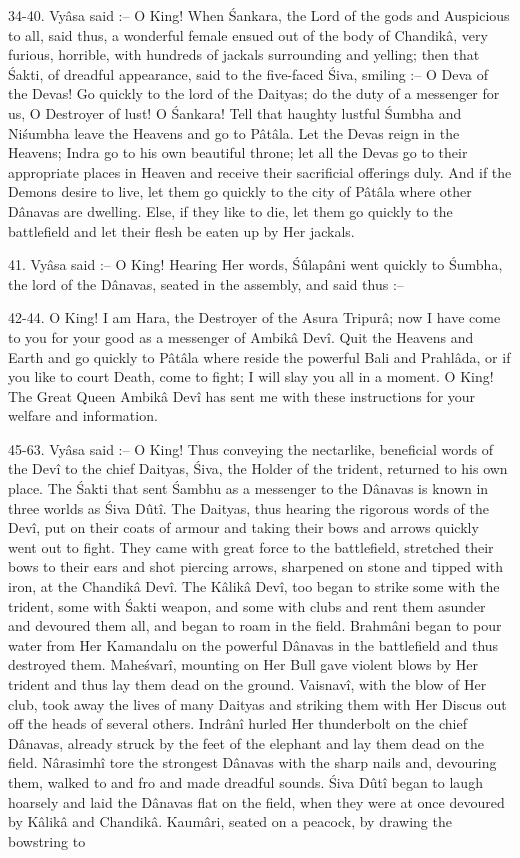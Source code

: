 34-40. Vy\^asa said :-- O King! When \'Sankara, the Lord of the gods and Auspicious to all, said thus, a wonderful female ensued out of the body of Chandik\^a, very furious, horrible, with hundreds of jackals surrounding and yelling; then that \'Sakti, of dreadful appearance, said to the five-faced \'Siva, smiling :-- O Deva of the Devas! Go quickly to the lord of the Daityas; do the duty of a messenger for us, O Destroyer of lust! O \'Sankara! Tell that haughty lustful \'Sumbha and Ni\'sumbha leave the Heavens and go to P\^at\^ala. Let the Devas reign in the Heavens; Indra go to his own beautiful throne; let all the Devas go to their appropriate places in Heaven and receive their sacrificial offerings duly. And if the Demons desire to live, let them go quickly to the city of P\^at\^ala where other D\^anavas are dwelling. Else, if they like to die, let them go quickly to the battlefield and let their flesh be eaten up by Her jackals.

41. Vy\^asa said :-- O King! Hearing Her words, \'S\^ulap\^ani went quickly to \'Sumbha, the lord of the D\^anavas, seated in the assembly, and said thus :--

42-44. O King! I am Hara, the Destroyer of the Asura Tripur\^a; now I have come to you for your good as a messenger of Ambik\^a Dev\^i. Quit the Heavens and Earth and go quickly to P\^at\^ala where reside the powerful Bali and Prahl\^ada, or if you like to court Death, come to fight; I will slay you all in a moment. O King! The Great Queen Ambik\^a Dev\^i has sent me with these instructions for your welfare and information.

45-63. Vy\^asa said :-- O King! Thus conveying the nectarlike, beneficial words of the Dev\^i to the chief Daityas, \'Siva, the Holder of the trident, returned to his own place. The \'Sakti that sent \'Sambhu as a messenger to the D\^anavas is known in three worlds as \'Siva D\^ut\^i. The Daityas, thus hearing the rigorous words of the Dev\^i, put on their coats of armour and taking their bows and arrows quickly went out to fight. They came with great force to the battlefield, stretched their bows to their ears and shot piercing arrows, sharpened on stone and tipped with iron, at the Chandik\^a Dev\^i. The K\^alik\^a Dev\^i, too began to strike some with the trident, some with \'Sakti weapon, and some with clubs and rent them asunder and devoured them all, and began to roam in the field. Brahm\^ani began to pour water from Her Kamandalu on the powerful D\^anavas in the battlefield and thus destroyed them. Mahe\'svar\^i, mounting on Her Bull gave violent blows by Her trident and thus lay them dead on the ground. Vaisnav\^i, with the blow of Her club, took away the lives of many Daityas and striking them with Her Discus out off the heads of several others. Indr\^an\^i hurled Her thunderbolt on the chief D\^anavas, already struck by the feet of the elephant and lay them dead on the field. N\^arasimh\^i tore the strongest D\^anavas with the sharp nails and, devouring them, walked to and fro and made dreadful sounds. \'Siva D\^ut\^i began to laugh hoarsely and laid the D\^anavas flat on the field, when they were at once devoured by K\^alik\^a and Chandik\^a. Kaum\^ari, seated on a peacock, by drawing the bowstring to

